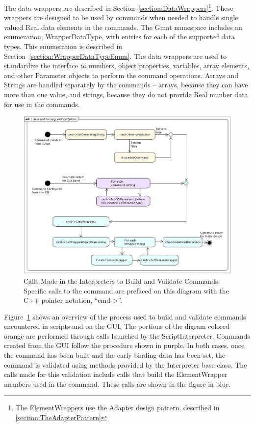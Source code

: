 The data wrappers are described in Section~\ref{section:DataWrappers}\footnote{The ElementWrappers
use the Adapter design pattern, described in \ref{section:TheAdapterPattern}}. These wrappers are
designed to be used by commands when needed to handle single valued Real data elements in the
commands.  The Gmat namespace includes an enumeration, WrapperDataType, with entries for each of the
supported data types.  This enumeration is described in Section~\ref{section:WrapperDataTypeEnum}.
The data wrappers are used to standardize the interface to numbers, object properties, variables,
array elements, and other Parameter objects to perform the command operations. Arrays and Strings
are handled separately by the commands -- arrays, because they can have more than one value, and
strings, because they do not provide Real number data for use in the commands.

\begin{figure}[htb]
\begin{center}
\includegraphics[scale=0.5]{Images/CommandParsingandValidation.eps}
\caption[Calls Made to Build and Validate Commands]{\label{figure:CommandParsingFlow}Calls Made in
the Interpreters to Build and Validate Commands.  Specific calls to the command are prefaced on this
diagram with the C++ pointer notation, ``cmd->''.}
\end{center}
\end{figure}

Figure~\ref{figure:CommandParsingFlow} shows an overview of the process used to build and validate
commands encountered in scripts and on the GUI.  The portions of the digram colored orange are
performed through calls launched by the ScriptInterpreter.  Commands created from the GUI follow the
procedure shown in purple.  In both cases, once the command has been built and the early binding
data has been set, the command is validated using methods provided by the Interpreter base class.
The calls made for this validation include calls that build the ElementWrapper members used in the
command.  These calls are shown in the figure in blue.

